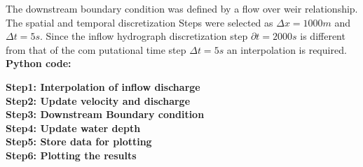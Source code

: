 \documentclass{article}
\begin{document}
The downstream boundary condition was defined 
by a flow over weir relationship. The spatial and temporal discretization 
Steps were selected as \(\Delta x = 1000 m\) and \(\Delta t = 5 s\). Since the inflow hydrograph discretization step \(\partial t = 2000 s\) is different from that of the com
putational time step \(\Delta t = 5 s\) an interpolation is required.\\

\noindent
\textbf{Python code:}

\noindent
\textbf{Step1: Interpolation of inflow discharge}\\

\noindent
\textbf{Step2: Update velocity and discharge}\\

\noindent
\textbf{Step3: Downstream Boundary condition}\\

\noindent
\textbf{Step4: Update water depth}\\

\noindent
\textbf{Step5: Store data for plotting}\\

\noindent
\textbf{Step6: Plotting the results}\\
\end{document}
